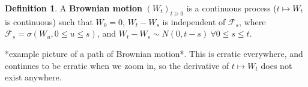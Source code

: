 \documentclass{article}
\theoremstyle{definition}
\newtheorem{defn}{Definition}[section]
\begin{document}
\begin{defn}
    A \textbf{Brownian motion} $(W_t)_{t\ge 0}$ is a continuous process ($t \mapsto W_t$ is continuous) such that $W_0=0$, $W_t - W_s$ is independent of $\mathcal{F}_s$, where $\mathcal{F}_s=\sigma(W_u,  0\le u\le s)$, and $W_t-W_s \sim N(0,t-s) ~\forall 0\le s\le t$.
\end{defn}

*example picture of a path of Brownian motion*. This is erratic everywhere, and continues to be erratic when we zoom in, so the derivative of $t \mapsto W_t$ does not exist anywhere.
\end{document}
